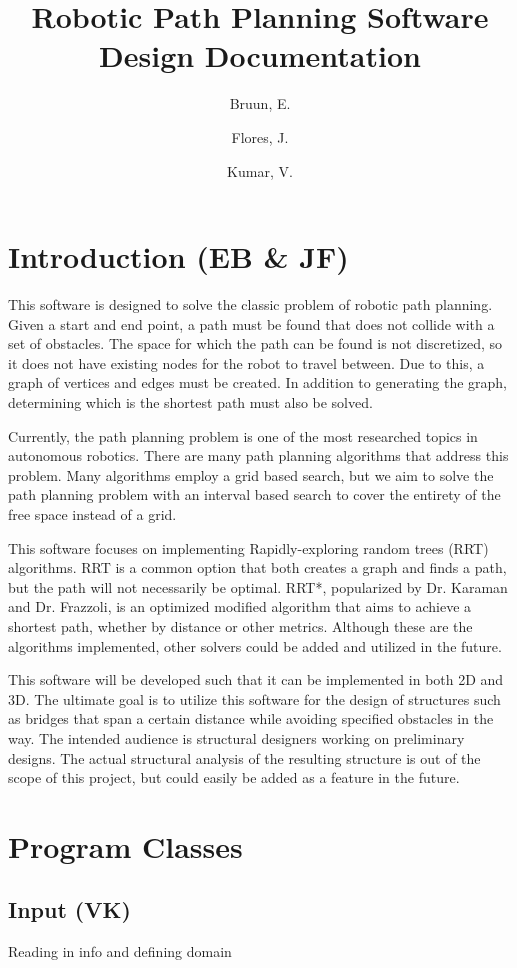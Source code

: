 \documentclass[10pt]{article}
\title{Robotic Path Planning Software Design Documentation}
\author{Bruun, E. \and Flores, J. \and Kumar, V.}
\begin{document}
\maketitle

\section{Introduction (EB \& JF)}
This software is designed to solve the classic problem of robotic path planning. Given a start and end point, a path must be found that does not collide with a set of obstacles. The space for which the path can be found is not discretized, so it does not have existing nodes for the robot to travel between. Due to this, a graph of vertices and edges must be created. In addition to generating the graph, determining which is the shortest path must also be solved. 

Currently, the path planning problem is one of the most researched topics in autonomous robotics. There are many path planning algorithms that address this problem. Many algorithms employ a grid based search, but we aim to solve the path planning problem with an interval based search to cover the entirety of the free space instead of a grid.  

This software focuses on implementing Rapidly-exploring random trees (RRT) algorithms. RRT is a common option that both creates a graph and finds a path, but the path will not necessarily be optimal. RRT*, popularized by Dr. Karaman and Dr. Frazzoli, is an optimized modified algorithm that aims to achieve a shortest path, whether by distance or other metrics. Although these are the algorithms implemented, other solvers could be added and utilized in the future.

This software will be developed such that it can be implemented in both 2D and 3D. The ultimate goal is to utilize this software for the design of structures such as bridges that span a certain distance while avoiding specified obstacles in the way. The intended audience is structural designers working on preliminary designs. The actual structural analysis of the resulting structure is out of the scope of this project, but could easily be added as a feature in the future. 

\newpage
\section{Program Classes}

\subsection{Input (VK)}
Reading in info and defining domain
\end{document}
